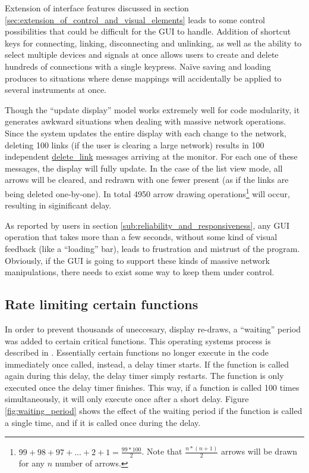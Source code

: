 Extension of interface features discussed in section \ref{sec:extension_of_control_and_visual_elements} leads to some control possibilities that could be difficult for the GUI to handle. Addition of shortcut keys for connecting, linking, disconnecting and unlinking, as well as the ability to select multiple devices and signals at once allows users to create and delete hundreds of connections with a single keypress. Na\"{i}ve saving and loading produces to situations where dense mappings will accidentally be applied to several instruments at once.

Though the ``update display'' model works extremely well for code modularity, it generates awkward situations when dealing with massive network operations. Since the system updates the entire display with each change to the network, deleting 100 links (if the user is clearing a large network) results in 100 independent \url{delete_link} messages arriving at the monitor. For each one of these messages, the display will fully update. In the case of the list view mode, all arrows will be cleared, and redrawn with one fewer present (as if the links are being deleted one-by-one). In total 4950 arrow drawing operations\footnote{$99 + 98 + 97 + ... + 2 + 1 = \frac{99*100}{2}$. Note that $\frac{n*(n+1)}{2}$ arrows will be drawn for any $n$ number of arrows.} will occur, resulting in siginificant delay. 

As reported by users in section \ref{sub:reliability_and_responsiveness}, any GUI operation that takes more than a few seconds, without some kind of visual feedback (like a ``loading'' bar), leads to frustration and mistrust of the program. Obviously, if the GUI is going to support these kinds of massive network manipulations, there needs to exist some way to keep them under control.

	\subsection{Rate limiting certain functions} %
	\label{sub:rate_limiting_certain_functions}

In order to prevent thousands of uneccesary, display re-draws, a ``waiting'' period was added to certain critical functions. This operating systems process is described in . Essentially certain functions no longer execute in the code immediately once called, instead, a delay timer starts. If the function is called again during this delay, the delay timer simply restarts. The function is only executed once the delay timer finishes. This way, if a function is called 100 times simultaneously, it will only execute once after a short delay. Figure \ref{fig:waiting_period} shows the effect of the waiting period if the function is called a single time, and if it is called once during the delay.

